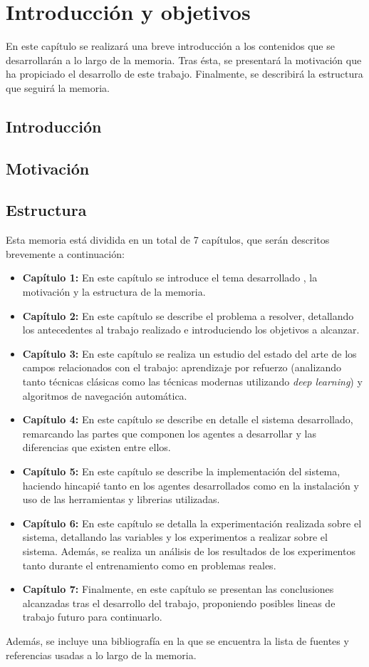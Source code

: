 \chapter{Introducción y objetivos}

En este capítulo se realizará una breve introducción a los contenidos que se desarrollarán a lo largo de la memoria. Tras ésta, se presentará la motivación que ha propiciado el desarrollo de este trabajo. Finalmente, se describirá la estructura que seguirá la memoria.

\section{Introducción}

\section{Motivación}

\section{Estructura}

Esta memoria está dividida en un total de 7 capítulos, que serán descritos brevemente a continuación:

\begin{itemize}
	\item \textbf{Capítulo 1:} En este capítulo se introduce el tema desarrollado , la motivación y la estructura de la memoria.
	\item \textbf{Capítulo 2:} En este capítulo se describe el problema a resolver, detallando los antecedentes al trabajo realizado e introduciendo los objetivos a alcanzar.
	\item \textbf{Capítulo 3:} En este capítulo se realiza un estudio del estado del arte de los campos relacionados con el trabajo: aprendizaje por refuerzo (analizando tanto técnicas clásicas como las técnicas modernas utilizando \textit{deep learning}) y algoritmos de navegación automática.
	\item \textbf{Capítulo 4:} En este capítulo se describe en detalle el sistema desarrollado, remarcando las partes que componen los agentes a desarrollar y las diferencias que existen entre ellos.
	\item \textbf{Capítulo 5:} En este capítulo se describe la implementación del sistema, haciendo hincapié tanto en los agentes desarrollados como en la instalación y uso de las herramientas y librerias utilizadas.
	\item \textbf{Capítulo 6:} En este capítulo se detalla la experimentación realizada sobre el sistema, detallando las variables y los experimentos a realizar sobre el sistema. Además, se realiza un análisis de los resultados de los experimentos tanto durante el entrenamiento como en problemas reales.
	\item \textbf{Capítulo 7:} Finalmente, en este capítulo se presentan las conclusiones alcanzadas tras el desarrollo del trabajo, proponiendo posibles lineas de trabajo futuro para continuarlo.
\end{itemize}

Además, se incluye una bibliografía en la que se encuentra la lista de fuentes y referencias usadas a lo largo de la memoria.

